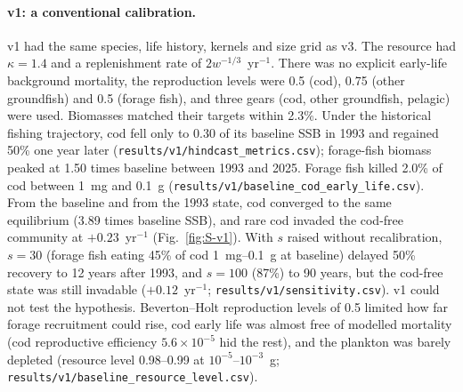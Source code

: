 \documentclass[11pt,letterpaper,fleqn]{article}
\newcommand{\yr}{yr$^{-1}$}
\begin{document}
\paragraph{v1: a conventional calibration.} v1 had the same species, life history, kernels and size grid as v3. The resource had $\kappa=1.4$ and a replenishment rate of $2w^{-1/3}$~\yr{}. There was no explicit early-life background mortality, the reproduction levels were 0.5 (cod), 0.75 (other groundfish) and 0.5 (forage fish), and three gears (cod, other groundfish, pelagic) were used. Biomasses matched their targets within 2.3\%. Under the historical fishing trajectory, cod fell only to 0.30 of its baseline SSB in 1993 and regained 50\% one year later (\nolinkurl{results/v1/hindcast_metrics.csv}); forage-fish biomass peaked at 1.50 times baseline between 1993 and 2025. Forage fish killed 2.0\% of cod between 1~mg and 0.1~g (\nolinkurl{results/v1/baseline_cod_early_life.csv}). From the baseline and from the 1993 state, cod converged to the same equilibrium (3.89 times baseline SSB), and rare cod invaded the cod-free community at $+0.23$~\yr{} (Fig.~\ref{fig:S-v1}). With $s$ raised without recalibration, $s=30$ (forage fish eating 45\% of cod 1~mg--0.1~g at baseline) delayed 50\% recovery to 12 years after 1993, and $s=100$ (87\%) to 90 years, but the cod-free state was still invadable ($+0.12$~\yr{}; \nolinkurl{results/v1/sensitivity.csv}). v1 could not test the hypothesis. Beverton--Holt reproduction levels of 0.5 limited how far forage recruitment could rise, cod early life was almost free of modelled mortality (cod reproductive efficiency $5.6\times10^{-5}$ hid the rest), and the plankton was barely depleted (resource level 0.98--0.99 at $10^{-5}$--$10^{-3}$~g; \nolinkurl{results/v1/baseline_resource_level.csv}).
\end{document}
